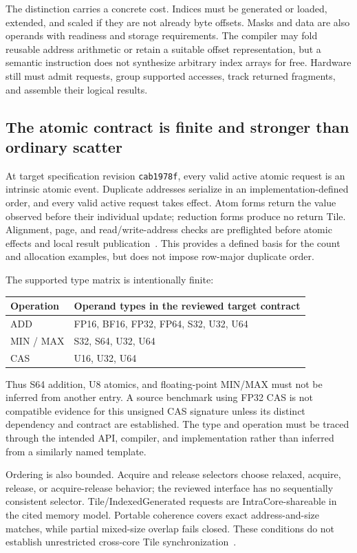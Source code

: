 The distinction carries a concrete cost. Indices must be generated or loaded, extended, and scaled if they are not already byte offsets. Masks and data are also operands with readiness and storage requirements. The compiler may fold reusable address arithmetic or retain a suitable offset representation, but a semantic instruction does not synthesize arbitrary index arrays for free. Hardware still must admit requests, group supported accesses, track returned fragments, and assemble their logical results.

\subsection{The atomic contract is finite and stronger than ordinary scatter}

At target specification revision \texttt{cab1978f}, every valid active atomic request is an intrinsic atomic event. Duplicate addresses serialize in an implementation-defined order, and every valid active request takes effect. Atom forms return the value observed before their individual update; reduction forms produce no return Tile. Alignment, page, and read/write-address checks are preflighted before atomic effects and local result publication~\citep{u004_spec_atomic,u004_spec_atomic_execution}. This provides a defined basis for the count and allocation examples, but does not impose row-major duplicate order.

The supported type matrix is intentionally finite:
\begin{center}
\begin{tabularx}{\linewidth}{@{}lX@{}}
\toprule
Operation & Operand types in the reviewed target contract \\
\midrule
ADD & FP16, BF16, FP32, FP64, S32, U32, U64 \\
MIN / MAX & S32, S64, U32, U64 \\
CAS & U16, U32, U64 \\
\bottomrule
\end{tabularx}
\end{center}
Thus S64 addition, U8 atomics, and floating-point MIN/MAX must not be inferred from another entry. A source benchmark using FP32 CAS is not compatible evidence for this unsigned CAS signature unless its distinct dependency and contract are established. The type and operation must be traced through the intended API, compiler, and implementation rather than inferred from a similarly named template.

Ordering is also bounded. Acquire and release selectors choose relaxed, acquire, release, or acquire-release behavior; the reviewed interface has no sequentially consistent selector. Tile/IndexedGenerated requests are IntraCore-shareable in the cited memory model. Portable coherence covers exact address-and-size matches, while partial mixed-size overlap fails closed. These conditions do not establish unrestricted cross-core Tile synchronization~\citep{u004_spec_ordering,u004_spec_coherence}.

